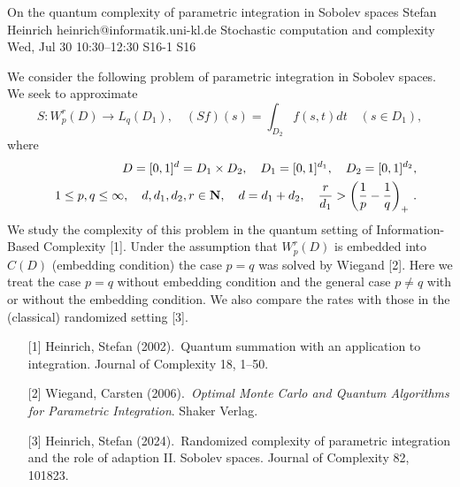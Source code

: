 \begin{talk}
  {On the quantum complexity of parametric integration in Sobolev spaces}%
  {Stefan Heinrich}%
  {heinrich@informatik.uni-kl.de}%
  {Stochastic computation and complexity}%
  {}%
  {}%
  {Wed, Jul 30 10:30–12:30}%
  {S16-1}%
  {S16}%
				
			
We consider the following problem of parametric integration in Sobolev spaces. We seek to approximate
$$
S:W_p^r(D)\to L_q(D_1), \quad (Sf)(s)=\int_{D_2}f(s,t)dt \quad (s\in D_1),
$$ 
where 
%
\begin{eqnarray*}
&&D=[0,1]^d=D_1\times D_2,\quad D_1=[0,1]^{d_1}, \quad D_2=[0,1]^{d_2}, 
\\
&&1\le p,q\le \infty, \quad d,d_1,d_2,r\in {\bf N},\quad d=d_1+d_2,\quad \frac{r}{d_1}>\left(\frac{1}{p}-\frac{1}{q}\right)_+\, .
\end{eqnarray*}
%
We study the complexity of this problem in the quantum setting of Information-Based Complexity [1]. Under the assumption that $W_p^r(D)$ is embedded into $C(D)$ (embedding condition) the case $p=q$ was solved by Wiegand [2]. Here we treat the case $p=q$ without embedding condition and the general case $p\ne q$ with or without the embedding condition. We also compare the rates with those in the (classical) randomized setting [3].


\medskip

\begin{enumerate}

\item[{[1]}] Heinrich, Stefan (2002).\  Quantum summation with an application to integration. 
Journal of Complexity 18, 1--50.
\item[{[2]}] Wiegand, Carsten (2006).\ {\it Optimal Monte Carlo and Quantum Algorithms for Parametric Integration}. Shaker Verlag.
\item[{[3]}] Heinrich, Stefan (2024).\  Randomized complexity of parametric integration and
the role of adaption  II. Sobolev spaces. Journal of Complexity 82, 101823.
\end{enumerate}

\end{talk}

